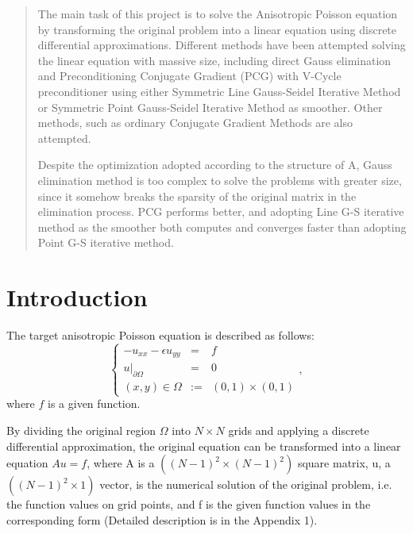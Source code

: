 \documentclass{article}
\begin{document}

\begin{abstract}
The main task of this project is to solve the Anisotropic Poisson equation by transforming the original problem into a linear equation using discrete differential approximations. Different methods have been attempted solving the linear equation with massive size, including direct Gauss elimination and Preconditioning Conjugate Gradient (PCG) with V-Cycle preconditioner using either Symmetric Line Gauss-Seidel Iterative Method or Symmetric Point Gauss-Seidel Iterative Method as smoother. Other methods, such as ordinary Conjugate Gradient Methods are also attempted.

Despite the optimization adopted according to the structure of A, Gauss elimination method is too complex to solve the problems with greater size, since it somehow breaks the sparsity of the original matrix in the elimination process. PCG performs better, and adopting Line G-S iterative method as the smoother both computes and converges faster than adopting Point G-S iterative method.
\end{abstract}

\section{Introduction}

The target anisotropic Poisson equation is described as follows:
\begin{displaymath}
  \left\{
    \begin{array}{ccl}
      -u_{xx}-\epsilon u_{yy} &=& f \\
      u|_{\partial \Omega} &=& 0 \\
      (x,y)\in \Omega &:=& (0,1)\times(0,1)
    \end{array}
  \right.,
\end{displaymath}
where $f$ is a given function.

By dividing the original region $\Omega$ into $N \times N$ grids and applying a discrete differential approximation, the original equation can be transformed into a linear equation $Au=f$, where A is a $((N-1)^2 \times (N-1)^2)$ square matrix, u, a $((N-1)^2 \times 1)$ vector, is the numerical solution of the original problem, i.e. the function values on grid points, and f is the given function values in the corresponding form (Detailed description is in the Appendix 1).
\end{document}
